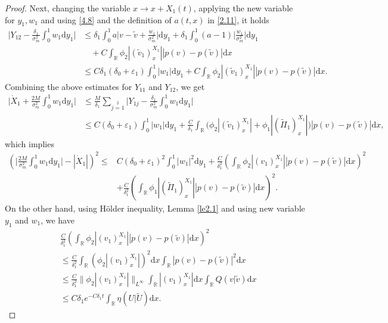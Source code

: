 \documentclass[10pt,reqno]{amsart}
\numberwithin{equation}{section}
\newcommand{\dif}{\mathrm{d}}
\begin{document}
\begin{proof}
Next, changing the variable $x\rightarrow x+X_1(t)$, applying the new variable for $y_1,w_1$ and using \eqref{4.8} and the definition of $a(t,x)$ in \eqref{2.11}, it holds
\[
\begin{aligned}
\Big|Y_{12}-\frac{\delta_1}{\sigma_m^2}\int_0^1w_1\dif y_1\Big|&\le
\delta_1\int_0^1a\Big|v-\widetilde v+\frac{w_1}{\sigma_m^2}\Big|\dif y_1
+\delta_1\int_0^1(a-1)\Big|\frac{w_1}{\sigma_m^2}\Big|\dif y_1\\
&\quad+C\int_\mathbb{R}\phi_2|(\widetilde{v}_1)^{X_1}_x||p(v)-p(\widetilde{v})|\dif x\\
&\le C\delta_1(\delta_0+\varepsilon_1)\int_0^1|w_1|\dif y_1
+C\int_\mathbb{R}\phi_2|(\widetilde{v}_1)^{X_1}_x||p(v)-p(\widetilde{v})|\dif x.
\end{aligned}
\]
Combining the above estimates for $Y_{11}$ and $Y_{12}$, we get
\begin{align*}
\Big|\dot{X}_1+\frac{2M}{\sigma_m^2}\int_0^1w_1\dif y_1\Big|&\le \frac{M}{\delta_1}\sum\limits_{j=1}\limits^2\Big|Y_{1j}-\frac{\delta_1}{\sigma_m^2}\int_0^1w_1\dif y_1\Big|\\
&\le C(\delta_0+\varepsilon_1)\int_0^1|w_1|\dif y_1
+\frac{C}{\delta_1}\int_\mathbb{R}\Big(\phi_2|(\widetilde{v}_1)^{X_1}_x|+\phi_1|(\widetilde{\Pi}_1)^{X_1}_x|\Big)|p(v)-p(\widetilde{v})|\dif x,
\end{align*}
which implies
\begin{align*}
\left(\Big|\frac{2M}{\sigma_m^2}\int_0^1w_1\dif y_1\Big|-|\dot{X}_1|\right)^2\le &C(\delta_0+\varepsilon_1)^2\int_0^1|w_1|^2\dif y_1
+\frac{C}{\delta_1^2}\left(\int_\mathbb{R}\phi_2|(v_1)^{X_1}_x|
|p(v)-p(\widetilde{v})|\dif x\right)^2\\
&+\frac{C}{\delta_1^2}\left(\int_\mathbb{R}\phi_1|(\widetilde{\Pi}_1)^{X_1}_x||p(v)-p(\widetilde{v})|\dif x\right)^2.
\end{align*}
On the other hand, using H\"{o}lder inequality, Lemma \ref{le2.1} and using new variable $y_1$ and $w_1$, we have
\begin{align*}
&\frac{C}{\delta_1^2}\left(\int_\mathbb{R}\phi_2|(v_1)^{X_1}_x|
|p(v)-p(\widetilde{v})|\dif x\right)^2\\
&\le\frac{C}{\delta_1^2}\int_\mathbb{R}(\phi_2|(v_1)^{X_1}_x|)^2\dif x
\int_\mathbb{R}|
p(v)-p(\widetilde{v})|^2\dif x\\
&\le \frac{C}{\delta_1^2}\|\phi_2|(v_1)^{X_1}_x|\|_{L^\infty}\int_\mathbb{R}|(v_1)^{X_1}_x|\dif x
\int_\mathbb{R}Q(v|\widetilde{v})\dif x\\
&\le C\delta_1 e^{-C\delta_1 t}\int_\mathbb{R}\eta(U|\widetilde{U})\dif x.

\end{align*}
\end{proof}
\end{document}
